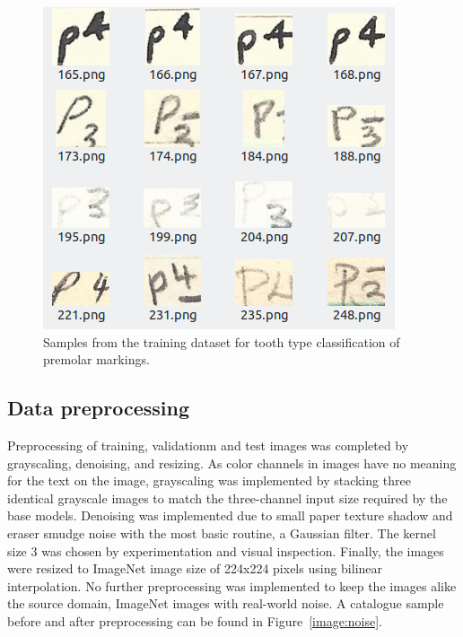 \documentclass[english,twoside,openright]{UH_DS_MSc}
\begin{document}
\begin{figure}[ht]
    \centering
    \includegraphics*[scale=.5]{images/trainingsamples.png}
    \caption{Samples from the training dataset for tooth type classification of premolar markings.}
    \label{image:samples}
\end{figure}

\subsection{Data preprocessing}
 
Preprocessing of training, validationm and test images was completed by grayscaling, denoising, and resizing.
As color channels in images have no meaning for the text on the image, grayscaling was implemented by
 stacking three identical grayscale images
to match the three-channel input size required by the base models.
Denoising was implemented due to
small paper texture shadow and eraser smudge noise with the most basic routine, a Gaussian filter.
The kernel size 3 was chosen by experimentation and visual inspection. Finally, the images were resized to 
ImageNet image size of 224x224 pixels using bilinear interpolation.
No further preprocessing was implemented to keep the images alike the source domain, ImageNet images with real-world noise.
 A catalogue sample before and after preprocessing can 
be found in Figure~\ref{image:noise}.
\end{document}
